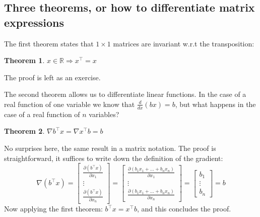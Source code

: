 \documentclass[notitlepage,oneside]{book}
\newtheorem{theorem}{Theorem}
\begin{document}
\subsection{Three theorems, or how to differentiate matrix expressions}
The first theorem states that $1\times 1$ matrices are invariant w.r.t the transposition:
\begin{theorem}
$x\in \mathbb R \Rightarrow x^\top = x$
\end{theorem}
The proof is left as an exercise.

The second theorem allows us to differentiate linear functions. In the case of a real function of one variable we know that
$\frac{d}{dx}(bx) = b$, but what happens in the case of a real function of $n$ variables?
\begin{theorem}
$\nabla b^\top x = \nabla x^\top b = b$
\end{theorem}
No surprises here, the same result in a matrix notation. The proof is straightforward, it suffices to write down the definition of the gradient:
$$\nabla(b^\top x) = \begin{bmatrix}\frac{\partial (b^\top x)}{\partial x_1} \\ \vdots \\ \frac{\partial (b^\top x)}{\partial x_n} \end{bmatrix} = \begin{bmatrix}\frac{\partial (b_1 x_1 + \dots + b_n x_n)}{\partial x_1} \\ \vdots \\ \frac{\partial (b_1 x_1 + \dots + b_n x_n)}{\partial x_n} \end{bmatrix}
= \begin{bmatrix}b_1 \\ \vdots \\ b_n \end{bmatrix} = b$$
Now applying the first theorem: $b^\top x = x^\top b$, and this concludes the proof.
\end{document}
